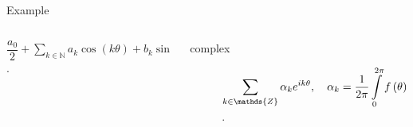 \begin{frame}
\begin{block}{Example}
\begin{columns}
\begin{column}{0.48\textwidth}
\begin{description}
						\begin{math}
							\displaystyle
							\dfrac{a_{0}}{2}+
							\sum\limits_{k\in\mathds{N}}
							a_{k}\cos\left(k\theta\right)+
							b_{k}\sin\left(k\theta\right)
						\end{math}.
				\end{description}
			\end{column}
			\begin{column}{0.48\textwidth}
				\begin{description}
					\item[complex]

						\begin{math}
							\displaystyle
							\sum\limits_{k\in\mathds{Z}}
							\alpha_{k}
							e^{ik\theta},\quad
							\alpha_{k}=
							\frac{1}{2\pi}
							\int\limits_{0}^{2\pi}
							f\left(\theta\right)
							e^{-ik\theta}\dl\theta
						\end{math}.
				\end{description}
			\end{column}
		\end{columns}
	\end{block}
\end{frame}

